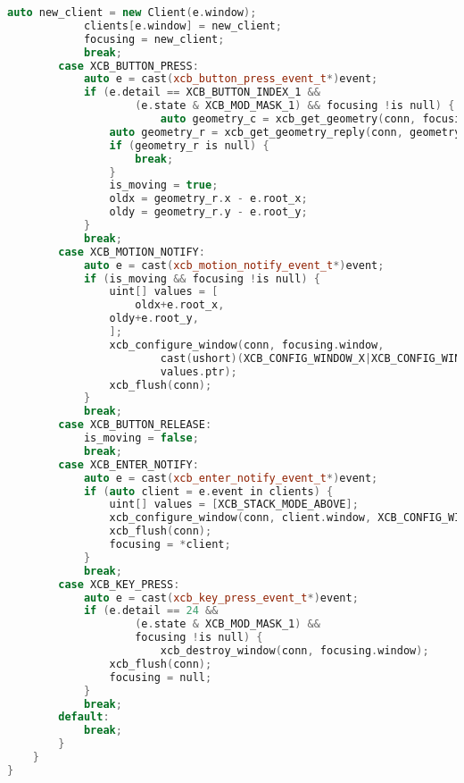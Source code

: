 \documentclass[12pt,a4paper]{jsarticle}
\begin{document}
\begin{lstlisting}[language=C++]
			auto new_client = new Client(e.window);
			clients[e.window] = new_client;
			focusing = new_client;
			break;
		case XCB_BUTTON_PRESS:
			auto e = cast(xcb_button_press_event_t*)event;
			if (e.detail == XCB_BUTTON_INDEX_1 &&
					(e.state & XCB_MOD_MASK_1) && focusing !is null) {
						auto geometry_c = xcb_get_geometry(conn, focusing.window);
				auto geometry_r = xcb_get_geometry_reply(conn, geometry_c, null);
				if (geometry_r is null) {
					break;
				}
				is_moving = true;
				oldx = geometry_r.x - e.root_x;
				oldy = geometry_r.y - e.root_y;
			}
			break;
		case XCB_MOTION_NOTIFY:
			auto e = cast(xcb_motion_notify_event_t*)event;
			if (is_moving && focusing !is null) {
				uint[] values = [
					oldx+e.root_x,
				oldy+e.root_y,
				];
				xcb_configure_window(conn, focusing.window,
						cast(ushort)(XCB_CONFIG_WINDOW_X|XCB_CONFIG_WINDOW_Y),
						values.ptr);
				xcb_flush(conn);
			}
			break;
		case XCB_BUTTON_RELEASE:
			is_moving = false;
			break;
		case XCB_ENTER_NOTIFY:
			auto e = cast(xcb_enter_notify_event_t*)event;
			if (auto client = e.event in clients) {
				uint[] values = [XCB_STACK_MODE_ABOVE];
				xcb_configure_window(conn, client.window, XCB_CONFIG_WINDOW_STACK_MODE, values.ptr);
				xcb_flush(conn);
				focusing = *client;
			}
			break;
		case XCB_KEY_PRESS:
			auto e = cast(xcb_key_press_event_t*)event;
			if (e.detail == 24 &&
					(e.state & XCB_MOD_MASK_1) &&
					focusing !is null) {
						xcb_destroy_window(conn, focusing.window);
				xcb_flush(conn);
				focusing = null;
			}
			break;
		default:
			break;
		}
	}
}
\end{lstlisting}
 
\end{document}
